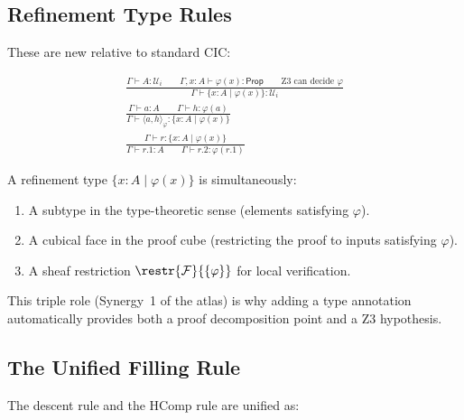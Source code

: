 \subsection{Refinement Type Rules}

These are new relative to standard CIC:

\begin{gather}
\frac{\Gamma \vdash A : \mathcal{U}_i \qquad
      \Gamma, x : A \vdash \varphi(x) : \mathsf{Prop} \qquad
      \text{Z3 can decide } \varphi}
     {\Gamma \vdash \{x : A \mid \varphi(x)\} : \mathcal{U}_i}
\tag{RefinF}
\\[6pt]
\frac{\Gamma \vdash a : A \qquad \Gamma \vdash h : \varphi(a)}
     {\Gamma \vdash \langle a, h \rangle_\varphi :
      \{x : A \mid \varphi(x)\}}
\tag{RefinI}
\\[6pt]
\frac{\Gamma \vdash r : \{x : A \mid \varphi(x)\}}
     {\Gamma \vdash r.1 : A \qquad \Gamma \vdash r.2 : \varphi(r.1)}
\tag{RefinE}
\end{gather}

\begin{remark}
A refinement type \(\{x : A \mid \varphi(x)\}\) is simultaneously:
\begin{enumerate}
\item A subtype in the type-theoretic sense (elements satisfying \(\varphi\)).
\item A cubical face in the proof cube (restricting the proof to inputs
  satisfying \(\varphi\)).
\item A sheaf restriction \(\restr{\mathcal{F}}{\{\varphi\}}\) for local
  verification.
\end{enumerate}
This triple role (Synergy~1 of the atlas) is why adding a type annotation
automatically provides both a proof decomposition point and a Z3 hypothesis.
\end{remark}

\subsection{The Unified Filling Rule}

The descent rule and the HComp rule are unified as:

